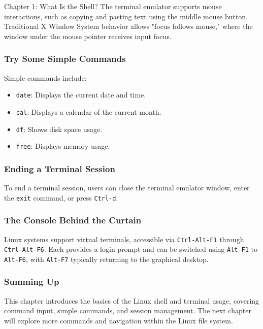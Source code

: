 \begin{notes}{Chapter 1: What Is the Shell?}
    The terminal emulator supports mouse interactions, such as copying and pasting text using the middle mouse button. Traditional X Window System behavior allows "focus follows mouse," where the 
    window under the mouse pointer receives input focus.

    \subsubsection*{Try Some Simple Commands}

    Simple commands include:

    \begin{highlight}
    \begin{itemize}
        \item \texttt{date}: Displays the current date and time.
        \item \texttt{cal}: Displays a calendar of the current month.
        \item \texttt{df}: Shows disk space usage.
        \item \texttt{free}: Displays memory usage.
    \end{itemize}
    \end{highlight}

    \subsubsection*{Ending a Terminal Session}

    To end a terminal session, users can close the terminal emulator window, enter the \texttt{exit} command, or press \texttt{Ctrl-d}.

    \subsubsection*{The Console Behind the Curtain}

    Linux systems support virtual terminals, accessible via \texttt{Ctrl-Alt-F1} through \texttt{Ctrl-Alt-F6}. Each provides a login prompt and can be switched using \texttt{Alt-F1} to 
    \texttt{Alt-F6}, with \texttt{Alt-F7} typically returning to the graphical desktop.

    \subsubsection*{Summing Up}

    This chapter introduces the basics of the Linux shell and terminal usage, covering command input, simple commands, and session management. The next chapter will explore more commands and 
    navigation within the Linux file system.


\end{notes}
